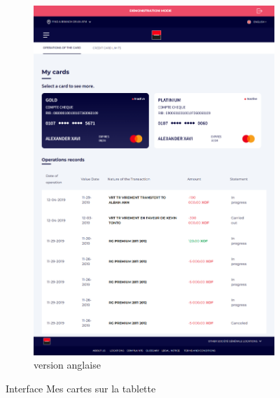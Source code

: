 \begin{figure}[!ht]
\begin{subfigure}[b]{0.49\textwidth}
        \includegraphics[width=\textwidth]{images/screens/cards/tablette.png}
        \caption{version anglaise}
    \end{subfigure}
       \caption{Interface Mes cartes sur la tablette}
\end{figure}

\newpage


